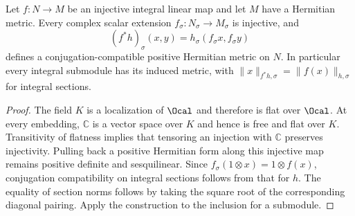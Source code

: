 \begin{lemma}
\label{lem:induced-hermitian-metric}
\leanok
Let $f:N\to M$ be an injective integral linear map and let $M$ have a
Hermitian metric. Every complex scalar extension $f_\sigma:N_\sigma\to
M_\sigma$ is injective, and
\[
 (f^*h)_\sigma(x,y)=h_\sigma(f_\sigma x,f_\sigma y)
\]
defines a conjugation-compatible positive Hermitian metric on $N$.
In particular every integral submodule has its induced metric, with
$\|x\|_{f^*h,\sigma}=\|f(x)\|_{h,\sigma}$ for integral sections.
\end{lemma}
\begin{proof}
The field $K$ is a localization of $\Ocal$ and therefore is flat over
$\Ocal$. At every embedding, $\mathbb C$ is a vector space over $K$
and hence is free and flat over $K$. Transitivity of flatness implies
that tensoring an injection with $\mathbb C$ preserves injectivity.
Pulling back a positive Hermitian form along this injective map remains
positive definite and sesquilinear. Since $f_\sigma(1\otimes x)=
1\otimes f(x)$, conjugation compatibility on integral sections follows
from that for $h$. The equality of section norms follows by taking the
square root of the corresponding diagonal pairing. Apply the construction
to the inclusion for a submodule.
\end{proof}

